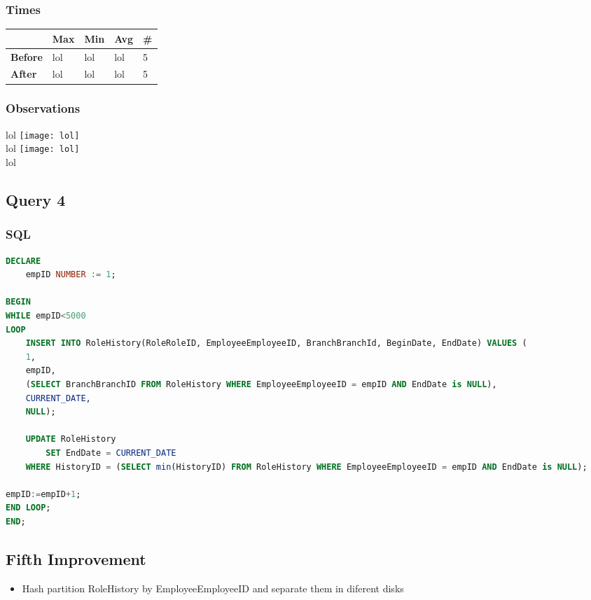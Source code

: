 \documentclass[a4paper, 10pt]{article}
\begin{document}
\subsubsection{Times}
\begin{table}[H]
\begin{tabular}{l|l|l|l|l|}
\cline{2-5}
\textbf{}                             & \textbf{Max} & \textbf{Min} & \textbf{Avg} & \textbf{\#}  \\ \hline
\multicolumn{1}{|l|}{\textbf{Before}} & lol         & lol         & lol          & 5            \\ \hline
\multicolumn{1}{|l|}{\textbf{After}}  & lol         & lol         & lol          & 5            \\ \hline
\end{tabular}
\end{table}
\subsubsection{Observations}
lol
\texttt{[image: lol]}\\ 
lol
\texttt{[image: lol]}\\
lol

\subsection{Query 4}
\subsubsection{SQL}
\begin{lstlisting}[language=SQL]
DECLARE 
    empID NUMBER := 1;

BEGIN
WHILE empID<5000
LOOP
    INSERT INTO RoleHistory(RoleRoleID, EmployeeEmployeeID, BranchBranchId, BeginDate, EndDate) VALUES (
    1,
    empID,
    (SELECT BranchBranchID FROM RoleHistory WHERE EmployeeEmployeeID = empID AND EndDate is NULL),
    CURRENT_DATE,
    NULL);

    UPDATE RoleHistory
        SET EndDate = CURRENT_DATE
    WHERE HistoryID = (SELECT min(HistoryID) FROM RoleHistory WHERE EmployeeEmployeeID = empID AND EndDate is NULL);

empID:=empID+1;
END LOOP;
END;
\end{lstlisting}

\subsection{Fifth Improvement}
\begin{itemize}
  \item Hash partition RoleHistory by EmployeeEmployeeID and separate them in diferent disks
\end{itemize}
\end{document}

